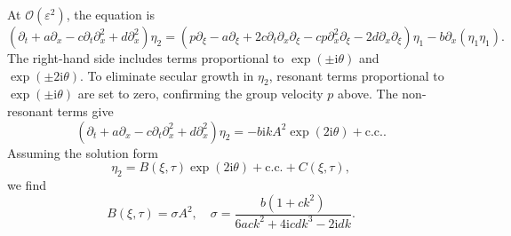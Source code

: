 \documentclass[alpha-refs, 12pt]{wiley-article}
\renewcommand{\O}{\mathcal{O}}
\newcommand{\ui}{\mathrm{i}}
\newcommand{\eps}{\varepsilon}
\begin{document}
At $\O(\eps^2)$, the equation is
\begin{equation}\label{eq:second_order_b}
  \left( \partial_t + a \partial_x - c \partial_t \partial_x^2 + d \partial_x^2 \right) \eta_2 = \left( p \partial_\xi - a \partial_\xi + 2 c \partial_t \partial_x \partial_\xi - c p \partial_x^2 \partial_\xi - 2 d \partial_x \partial_\xi \right) \eta_1 - b \partial_x (\eta_1 \eta_1).
\end{equation}
The right-hand side includes terms proportional to $\exp(\pm \ui \theta)$ and $\exp(\pm 2 \ui \theta)$. To eliminate secular growth in $\eta_2$, resonant terms proportional to $\exp(\pm \ui \theta)$ are set to zero, confirming the group velocity $p$ above. The non-resonant terms give
\begin{equation}\label{eq:second_order_nonresonant}
  \left( \partial_t + a \partial_x - c \partial_t \partial_x^2 + d \partial_x^2 \right) \eta_2 = - b \ui k A^2 \exp(2 \ui \theta) + \text{c.c.}.
\end{equation}
Assuming the solution form
\begin{equation}\label{eq:eta2_solution}
  \eta_2 = B(\xi, \tau) \exp(2 \ui \theta) + \text{c.c.} + C(\xi, \tau),
\end{equation}
we find
\begin{equation}\label{eq:B_solution}
  B(\xi, \tau) = \sigma A^2, \quad \sigma = \frac{b (1 + c k^2)}{6 a c k^2 + 4 \ui c d k^3 - 2 \ui d k}.
\end{equation}
\end{document}
